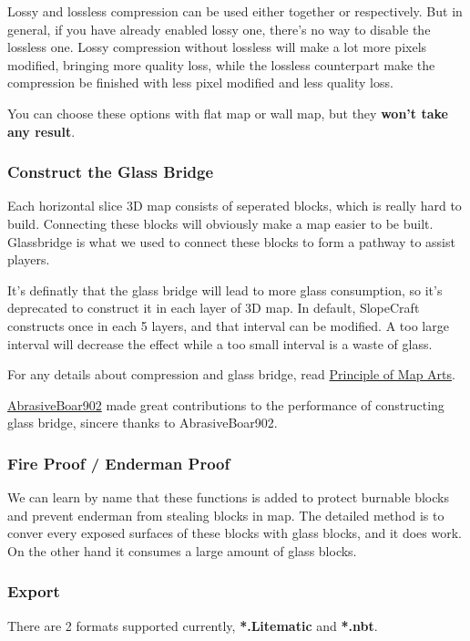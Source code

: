 \documentclass{article}
\begin{document}
    Lossy and lossless compression can be used either together or respectively. But in general, if you have already enabled lossy one, there's no way to disable the lossless one. Lossy compression without lossless will make a lot more pixels modified, bringing more quality loss, while the lossless counterpart make the compression be finished with less pixel modified and less quality loss.
    
    You can choose these options with flat map or wall map, but they \textbf{won't take any result}.

    \subsubsection{Construct the Glass Bridge}
    Each horizontal slice 3D map consists of seperated blocks, which is really hard to build. Connecting these blocks will obviously make a map easier to be built. Glassbridge is what we used to connect these blocks to form a pathway to assist players.
    
    It's definatly that the glass bridge will lead to more glass consumption, so it's deprecated to construct it in each layer of 3D map. In default, SlopeCraft constructs once in each 5 layers, and that interval can be modified. A too large interval will decrease the effect while a too small interval is a waste of glass.
    
    For any details about compression and glass bridge, read \href{https://github.com/ToKiNoBug/SlopeCraftTutorial/blob/main/BasicPrinciple/Principle%20of%20map%20pixel%20arts.md}{Principle of Map Arts}.

    \href{https://github.com/AbrasiveBoar902}{AbrasiveBoar902} made great contributions to the performance of constructing glass bridge, sincere thanks to AbrasiveBoar902.

    \subsubsection{Fire Proof / Enderman Proof}
    We can learn by name that these functions is added to protect burnable blocks and prevent enderman from stealing blocks in map. The detailed method is to conver every exposed surfaces of these blocks with glass blocks, and it does work. On the other hand it consumes a large amount of glass blocks.

    \subsubsection{Export}
    There are 2 formats supported currently, \textbf{*.Litematic} and \textbf{*.nbt}.
\end{document}
